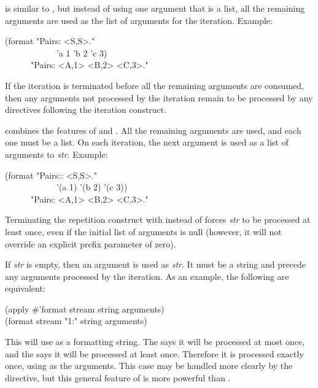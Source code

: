 \begin{flushdesc}
 is similar to , but instead of
using one argument that is a list, all the remaining arguments
are used as the list of arguments for the iteration.
Example:
\begin{lisp}
(format {\false} "Pairs:{\Xtilde}{\Xatsign}{\Xlbrace} <{\Xtilde}S,{\Xtilde}S>{\Xtilde}{\Xrbrace}." \\
~~~~~~~~~~~~'a 1 'b 2 'c 3) \\
~~~~~\EV\ "Pairs: <A,1> <B,2> <C,3>."
\end{lisp}
If the iteration is terminated before all the remaining arguments are
consumed, then any arguments not processed by the iteration remain to be
processed by any directives following the iteration construct.

combines the features of 
and .
All the remaining arguments
are used, and each one must be a list.
On each iteration, the next argument is used as a list of arguments to \emph{str}.
Example:
\begin{lisp}
(format {\false} "Pairs:{\Xtilde}:{\Xatsign}{\Xlbrace} <{\Xtilde}S,{\Xtilde}S>{\Xtilde}{\Xrbrace}." \\
~~~~~~~~~~~~'(a 1) '(b 2) '(c 3)) \\
~~~~~\EV\ "Pairs: <A,1> <B,2> <C,3>."
\end{lisp}

Terminating the repetition construct with \cd{{\Xtilde}:{\Xrbrace}} instead of
\cd{{\Xtilde}{\Xrbrace}} forces \emph{str} to be processed at least once, even if
the initial list of arguments is null (however, it will not override an explicit
prefix parameter of zero).

If \emph{str} is empty, then an argument is used as \emph{str}.  It must be a string
and precede any arguments processed by the iteration.  As an example,
the following are equivalent:
\begin{lisp}
(apply \#'format stream string arguments) \\
(format stream "{\Xtilde}1{\Xlbrace}{\Xtilde}:{\Xrbrace}" string arguments)
\end{lisp}
This will use  as a formatting string.  The  says it will
be processed at most once, and the \cd{{\Xtilde}:{\Xrbrace}} says it will be processed at least once.
Therefore it is processed exactly once, using  as the arguments.
This case may be handled more clearly by the  directive,
but this general feature of \cd{{\Xtilde}{\Xlbrace}}
is more powerful than .


\end{flushdesc}
